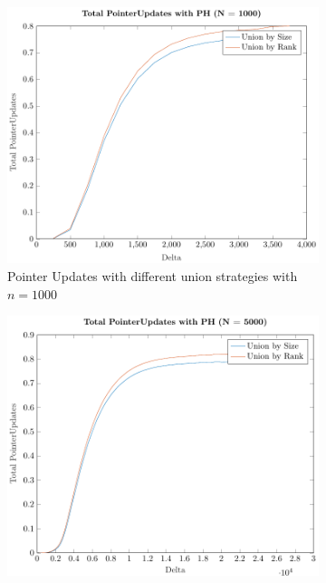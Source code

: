 \begin{figure}[ht]
    \centering
    \begin{subfigure}{0.32\textwidth}
        \centering
        \includegraphics[width=\textwidth]{../images/plotPHNonFull1000_PointerUpdates.pdf}
        \caption{Pointer Updates with different union strategies with $n = 1000$}
    \end{subfigure}%
    \hfill
    \begin{subfigure}{0.32\textwidth}
        \centering
        \includegraphics[width=\textwidth]{../images/plotPHNonFull5000_PointerUpdates.pdf}

\end{subfigure}
\end{figure}
